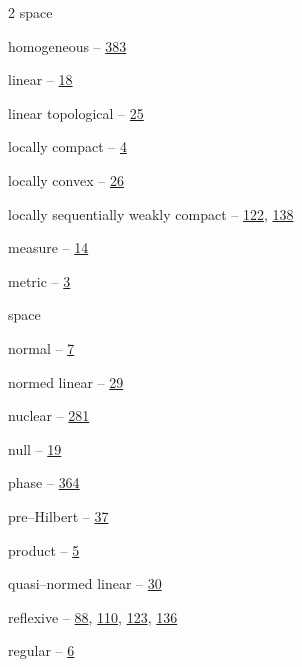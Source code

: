 \begin{multicols}{2}
\noindent space\par
\hspace*{1.1em}homogeneous -- \hyperlink{page.383}{383}\par
\hspace*{1.1em}linear -- \hyperlink{page.18}{18}\par
\hspace*{1.1em}linear topological -- \hyperlink{page.25}{25}\par
\hspace*{1.1em}locally compact -- \hyperlink{page.4}{4}\par
\hspace*{1.1em}locally convex -- \hyperlink{page.26}{26}\par
\hspace*{1.1em}locally sequentially weakly compact -- \hyperlink{page.122}{122}, \hyperlink{page.138}{138}\par
\hspace*{1.1em}measure -- \hyperlink{page.14}{14}\par
\hspace*{1.1em}metric -- \hyperlink{page.3}{3}\par
\noindent space\par
\hspace*{1.1em}normal -- \hyperlink{page.7}{7}\par
\hspace*{1.1em}normed linear -- \hyperlink{page.29}{29}\par
\hspace*{1.1em}nuclear -- \hyperlink{page.281}{281}\par
\hspace*{1.1em}null -- \hyperlink{page.19}{19}\par
\hspace*{1.1em}phase -- \hyperlink{page.364}{364}\par
\hspace*{1.1em}pre--Hilbert -- \hyperlink{page.37}{37}\par
\hspace*{1.1em}product -- \hyperlink{page.5}{5}\par
\hspace*{1.1em}quasi--normed linear -- \hyperlink{page.30}{30}\par
\hspace*{1.1em}reflexive -- \hyperlink{page.88}{88}, \hyperlink{page.110}{110}, \hyperlink{page.123}{123}, \hyperlink{page.136}{136}\par
\hspace*{1.1em}regular -- \hyperlink{page.6}{6}\par

\end{multicols}
